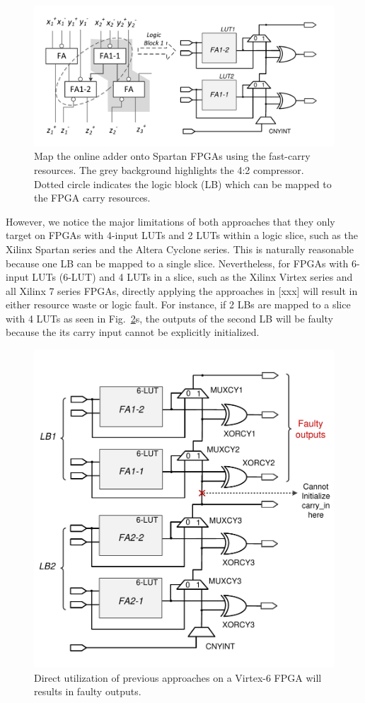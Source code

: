 \documentclass[conference]{IEEEtran}
\begin{document}
\begin{figure}[htbp]
	\centering
	\includegraphics[width=.5\textwidth]{./Figures/SDAdder_42comp_Spartan.pdf}
	\caption{Map the online adder onto Spartan FPGAs using the fast-carry resources. The grey background highlights the 4:2 compressor. Dotted circle indicates the logic block (LB) which can be mapped to the FPGA carry resources.}
	\label{Fig:PreviousWork}
\end{figure}

However, we notice the major limitations of both approaches that they only target on FPGAs with 4-input LUTs and 2 LUTs within a logic slice, such as the Xilinx Spartan series and the Altera Cyclone series. This is naturally reasonable because one LB can be mapped to a single slice. Nevertheless, for FPGAs with 6-input LUTs (6-LUT) and 4 LUTs in a slice, such as the Xilinx Virtex series and all Xilinx 7 series FPGAs, directly applying the approaches in [xxx] will result in either resource waste or logic fault. For instance, if 2 LBs are mapped to a slice with 4 LUTs as seen in Fig.~\ref{Fig:PreWorkVirtex6}s, the outputs of the second LB will be faulty because the its carry input cannot be explicitly initialized.

\begin{figure}[htbp]
	\centering
	\includegraphics[width=.45\textwidth]{./Figures/SDadder_FastCarry_PreviousWork.pdf}
	\caption{Direct utilization of previous approaches on a Virtex-6 FPGA will results in faulty outputs.}
	\label{Fig:PreWorkVirtex6}
\end{figure}
\end{document}
